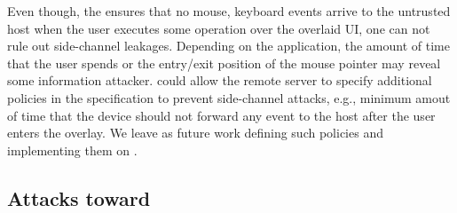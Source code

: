  Even though, the \device ensures that no mouse, keyboard events arrive to the untrusted host when the user executes some operation over the overlaid UI, one can not rule out side-channel leakages. Depending on the application, the amount of time that the user spends or the entry/exit position of the mouse pointer may reveal some information attacker. 
\device could allow the remote server to specify additional policies in the specification to prevent side-channel attacks, e.g., minimum amout of time that the device should not forward any event to the host after the user enters the overlay. We leave as future work defining such policies and implementing them on \name.




\subsection{Attacks toward \device}


\iffalse
\subsection{Protection against phishing attacks}
\subsection{Keyboard Manipulation Attacks and Defenses}
\subsubsection{Change user selected values}


\subsection{Mouse Manipulation Attacks and Defenses}
\subsubsection{Changing mouse position}
Changing the mouse position can be detected by the device as the device expects to find it in the location that the user provides. 
\subsubsection{Removing the mouse completely}
This is detectable by the \device as the \device no longer finds the mouse pointer in the screen at the designated position.  
\subsubsection{Add mouse cursor to confuse users}

\subsection{UI Manipulation Attacks and Defenses}
\subsubsection{Manipulate the position of the UI elements on the screen}
\fi